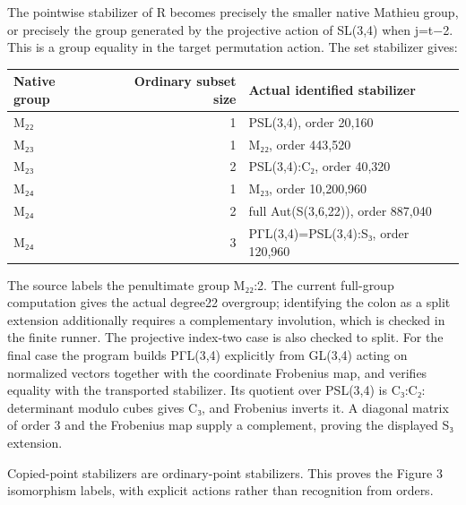 The pointwise stabilizer of R becomes precisely the smaller native
Mathieu group, or precisely the group generated by the projective action
of SL(3,4) when j=t−2. This is a group equality in the target
permutation action. The set stabilizer gives:

{\def\LTcaptype{none} %
\begin{longtable}[]{@{}lrl@{}}
\toprule\noalign{}
Native group & Ordinary subset size & Actual identified stabilizer \\
\midrule\noalign{}
\endhead
\bottomrule\noalign{}
\endlastfoot
M₂₂ & 1 & PSL(3,4), order 20,160 \\
M₂₃ & 1 & M₂₂, order 443,520 \\
M₂₃ & 2 & PSL(3,4):C₂, order 40,320 \\
M₂₄ & 1 & M₂₃, order 10,200,960 \\
M₂₄ & 2 & full Aut(S(3,6,22)), order 887,040 \\
M₂₄ & 3 & PΓL(3,4)=PSL(3,4):S₃, order 120,960 \\
\end{longtable}
}

The source labels the penultimate group M₂₂:2. The current full-group
computation gives the actual degree22 overgroup; identifying the colon
as a split extension additionally requires a complementary involution,
which is checked in the finite runner. The projective index-two case is
also checked to split. For the final case the program builds PΓL(3,4)
explicitly from GL(3,4) acting on normalized vectors together with the
coordinate Frobenius map, and verifies equality with the transported
stabilizer. Its quotient over PSL(3,4) is C₃:C₂: determinant modulo
cubes gives C₃, and Frobenius inverts it. A diagonal matrix of order 3
and the Frobenius map supply a complement, proving the displayed S₃
extension.

Copied-point stabilizers are ordinary-point stabilizers. This proves the
Figure 3 isomorphism labels, with explicit actions rather than
recognition from orders.
